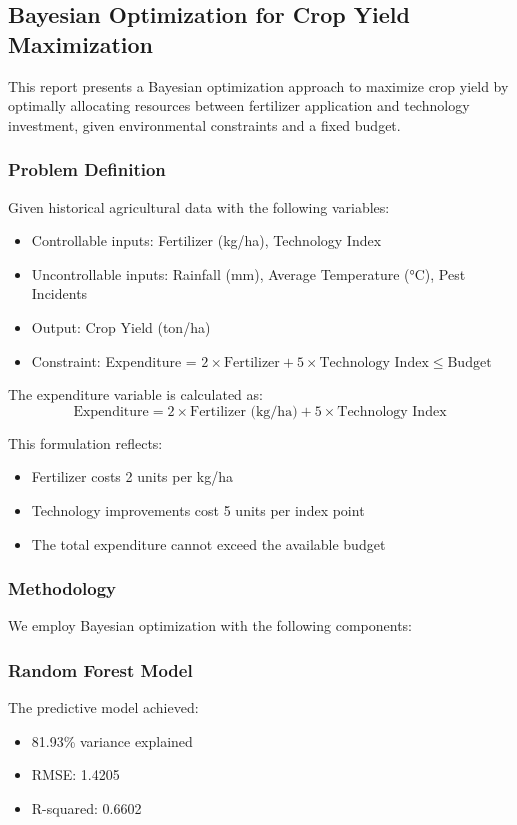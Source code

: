 \subsection{Bayesian Optimization for Crop Yield Maximization}

This report presents a Bayesian optimization approach to maximize crop yield by optimally allocating resources between fertilizer application and technology investment, given environmental constraints and a fixed budget.

\subsubsection{Problem Definition}
Given historical agricultural data with the following variables:
\begin{itemize}
    \item Controllable inputs: Fertilizer (kg/ha), Technology Index
    \item Uncontrollable inputs: Rainfall (mm), Average Temperature (°C), Pest Incidents
    \item Output: Crop Yield (ton/ha)
    \item Constraint: Expenditure = $2 \times \text{Fertilizer} + 5 \times \text{Technology Index} \leq \text{Budget}$
\end{itemize}

The expenditure variable is calculated as:
\begin{equation}
    \text{Expenditure} = 2 \times \text{Fertilizer (kg/ha)} + 5 \times \text{Technology Index}
\end{equation}

This formulation reflects:
\begin{itemize}
    \item Fertilizer costs 2 units per kg/ha
    \item Technology improvements cost 5 units per index point
    \item The total expenditure cannot exceed the available budget
\end{itemize}

\subsubsection{Methodology}
We employ Bayesian optimization with the following components:

\subsubsection{Random Forest Model}
The predictive model achieved:
\begin{itemize}
    \item 81.93\% variance explained
    \item RMSE: 1.4205
    \item R-squared: 0.6602
\end{itemize}

